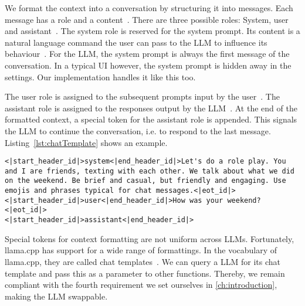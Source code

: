 We format the context into a conversation by structuring it into messages. Each message has a role and a content~\cite{jiangChatBugCommonVulnerability2025}. There are three possible roles: System, user and assistant~\cite{jiangChatBugCommonVulnerability2025}. The system role is reserved for the system prompt. Its content is a natural language command the user can pass to the \gls{LLM} to influence its behaviour~\cite{jiangChatBugCommonVulnerability2025}. For the \gls{LLM}, the system prompt is always the first message of the conversation. In a typical \gls{UI} however, the system prompt is hidden away in the settings. Our implementation handles it like this too.

The user role is assigned to the subsequent prompts input by the user~\cite{jiangChatBugCommonVulnerability2025}. The assistant role is assigned to the responses output by the \gls{LLM}~\cite{jiangChatBugCommonVulnerability2025}. At the end of the formatted context, a special token for the assistant role is appended. This signals the \gls{LLM} to continue the conversation, i.e. to respond to the last message. Listing~\ref{lst:chatTemplate} shows an example.

\vspace{0.25cm}

\begin{lstlisting}[caption={[llama.cpp: Chat templates]{Example for a context formatted with the chat template of Llama 3.2 1B. Some line breaks have been added for readability.}}, label={lst:chatTemplate}]
<|start_header_id|>system<|end_header_id|>Let's do a role play. You and I are friends, texting with each other. We talk about what we did on the weekend. Be brief and casual, but friendly and engaging. Use emojis and phrases typical for chat messages.<|eot_id|>
<|start_header_id|>user<|end_header_id|>How was your weekend?<|eot_id|>
<|start_header_id|>assistant<|end_header_id|>
\end{lstlisting}

Special tokens for context formatting are not uniform across \glspl{LLM}. Fortunately, llama.cpp has support for a wide range of formattings. In the vocabulary of llama.cpp, they are called chat templates~\cite{gerganovGgerganovLlamacpp2024,jiangChatBugCommonVulnerability2025}. We can query a \gls{LLM} for its chat template and pass this as a parameter to other functions. Thereby, we remain compliant with the fourth requirement we set ourselves in \cref{ch:introduction}, making the \gls{LLM} swappable.

